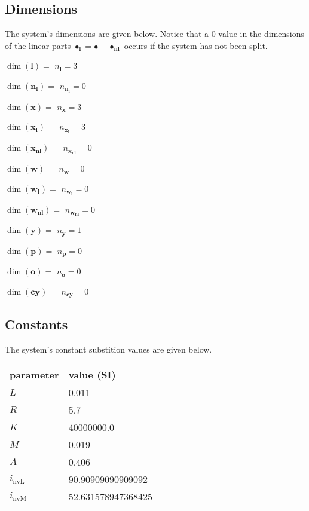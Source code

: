 \documentclass[11pt, oneside]{article}      %
\begin{document}
\subsection{Dimensions}
%
The system's dimensions are given below.
%
Notice that a 0 value in the dimensions of the linear parts
$\bullet_{\mathbf{l}} = \bullet-\bullet_{\mathbf{nl}}$ occurs if the system has
not been split.
%
\par  $\dim(\mathbf{l})=$ $ n_\mathbf{l} = 3$\par  $\dim(\mathbf{n_{l}})=$ $ n_\mathbf{n_{l}} = 0$\par  $\dim(\mathbf{x})=$ $ n_\mathbf{x} = 3$\par  $\dim(\mathbf{x_{l}})=$ $ n_\mathbf{x_{l}} = 3$\par  $\dim(\mathbf{x_{nl}})=$ $ n_\mathbf{x_{nl}} = 0$\par  $\dim(\mathbf{w})=$ $ n_\mathbf{w} = 0$\par  $\dim(\mathbf{w_{l}})=$ $ n_\mathbf{w_{l}} = 0$\par  $\dim(\mathbf{w_{nl}})=$ $ n_\mathbf{w_{nl}} = 0$\par  $\dim(\mathbf{y})=$ $ n_\mathbf{y} = 1$\par  $\dim(\mathbf{p})=$ $ n_\mathbf{p} = 0$\par  $\dim(\mathbf{o})=$ $ n_\mathbf{o} = 0$\par  $\dim(\mathbf{cy})=$ $ n_\mathbf{cy} = 0$
%
%
%
\subsection{Constants}
%
The system's constant substition values are given below.
%
\begin{center}
%
\begin{tabular}{ll}
%
\hline
parameter & value (SI)
\\ \hline
$L$ & 0.011
\\
$R$ & 5.7
\\
$K$ & 40000000.0
\\
$M$ & 0.019
\\
$A$ & 0.406
\\
$i_{\mathrm{nvL}}$ & 90.90909090909092
\\
$i_{\mathrm{nvM}}$ & 52.631578947368425
\\
\hline
\end{tabular}
%
\end{center}
%
%
%
\end{document}
